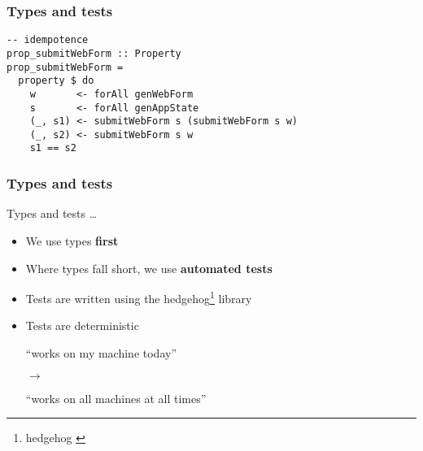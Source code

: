 \begin{frame}[fragile]
\frametitle{Types and tests}
\begin{block}{}
\begin{lstlisting}[style=haskell]
-- idempotence
prop_submitWebForm :: Property
prop_submitWebForm =
  property $ do
    w       <- forAll genWebForm
    s       <- forAll genAppState
    (_, s1) <- submitWebForm s (submitWebForm s w)
    (_, s2) <- submitWebForm s w
    s1 == s2
\end{lstlisting}
\end{block}
\end{frame}

\begin{frame}[fragile]
\frametitle{Types and tests}
\begin{block}{Types and tests \ldots}
\begin{itemize}
\item We use types \textbf{first}
\item Where types fall short, we use \textbf{automated tests}
\item Tests are written using the hedgehog\footnote{\tiny{hedgehog} \href{https://hackage.haskell.org/package/hedgehog}{}} library
\item Tests are deterministic

``works on my machine today''

$\rightarrow$

``works on all machines at all times''
\end{itemize}
\end{block}
\end{frame}



